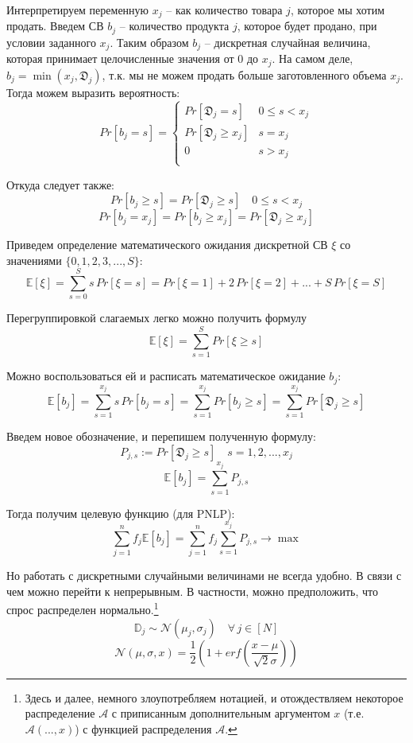 \documentclass[12pt, reqno]{article}
\theoremstyle{definition}
\theoremstyle{definition}
\theoremstyle{definition}
\theoremstyle{definition}
\theoremstyle{definition}
\theoremstyle{definition}
\theoremstyle{definition}
\theoremstyle{definition}
\theoremstyle{definition}
\begin{document}
		Интерпретируем переменную $x_j$ -- как количество товара $j$, которое мы хотим продать. Введем СВ $b_j$ -- количество продукта $j$, которое будет продано, при условии заданного $x_j$. Таким образом $b_j$ -- дискретная случайная величина, которая принимает целочисленные значения от $0$ до $x_j$. На самом деле, $b_j = \min(x_j, \mathfrak{D}_j)$, т.к. мы не можем продать больше заготовленного объема $x_j$. Тогда можем выразить вероятность:
		$$
		Pr[b_j = s] = 
		\begin{cases}
			Pr[\mathfrak{D}_j = s] & 0 \leq s < x_j \\
			Pr[\mathfrak{D}_j \geq x_j] & s = x_j \\
			0 & s > x_j \\
		\end{cases}
		$$
		
		Откуда следует также:
		$$Pr[b_j \geq s] = Pr[\mathfrak{D}_j \geq s]\quad 0 \leq s < x_j$$
		$$Pr[b_j = x_j] = Pr[b_j \geq x_j] = Pr[\mathfrak{D}_j \geq x_j]$$
		
		Приведем определение математического ожидания дискретной СВ $\xi$ со значениями $\{0, 1, 2, 3, ..., S\}$:
		$$\mathds{E}[\xi] = \sum\limits_{s = 0}^S s\,Pr[\xi = s] = Pr[\xi = 1] + 2\,Pr[\xi = 2] + ... + S\,Pr[\xi = S]$$
		
		Перегруппировкой слагаемых легко можно получить формулу
		\begin{equation}
			\mathds{E}[\xi] = \sum\limits_{s = 1}^S Pr[\xi \geq s]
		\end{equation}
	
		Можно воспользоваться ей и расписать математическое ожидание $b_j$:
		$$\mathds{E}[b_j] = \sum\limits_{s = 1}^{x_j} s\,Pr[b_j = s] = \sum\limits_{s = 1}^{x_j} Pr[b_j \geq s] = \sum\limits_{s = 1}^{x_j} Pr[\mathfrak{D}_j \geq s]$$
		
		Введем новое обозначение, и перепишем полученную формулу:
		$$P_{j,s} := Pr[\mathfrak{D}_j \geq s]\quad s = 1, 2, ..., x_j$$
		\begin{equation}
			\mathds{E}[b_j] = \sum\limits_{s = 1}^{x_j} P_{j,s}
		\end{equation}
		
		Тогда получим целевую функцию (для PNLP):
		\begin{equation}
			\sum\limits_{j=1}^n f_j \mathds{E}[b_j] = \sum\limits_{j=1}^n f_j \sum\limits_{s = 1}^{x_j} P_{j,s} \rightarrow \max
		\end{equation}
	
		Но работать с дискретными случайными величинами не всегда удобно. В связи с чем можно перейти к непрерывным. В частности, можно предположить, что спрос распределен нормально.\footnote{Здесь и далее, немного злоупотребляем нотацией, и отождествляем некоторое распределение $\mathcal{A}$ с приписанным дополнительным аргументом $x$ (т.е. $\mathcal{A}(..., x)$) с функцией распределения $\mathcal{A}$.}
		$$\mathds{D}_j \sim \mathcal{N}(\mu_j, \sigma_j) \quad \forall\, j \in [N]$$
		$$\mathcal{N}(\mu, \sigma, x) = \frac{1}{2}(1 + {erf}(\frac{x - \mu}{\sqrt{2}\sigma}))$$
		
\end{document}
